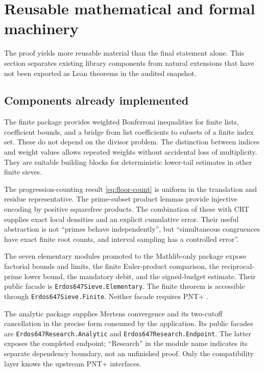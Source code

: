 \documentclass[11pt,a4paper]{article}
\theoremstyle{definition}
\theoremstyle{remark}
\numberwithin{equation}{section}
\newcommand{\smallcode}[1]{{\small\texttt{#1}}}
\begin{document}
\section{Reusable mathematical and formal machinery}\label{sec:reuse}
The proof yields more reusable material than the final statement alone. This
section separates existing library components from natural extensions that
have not been exported as Lean theorems in the audited snapshot.

\subsection{Components already implemented}
The finite package provides weighted Bonferroni inequalities for finite lists,
coefficient bounds, and a bridge from list coefficients to subsets of a finite
index set. These do not depend on the divisor problem. The distinction between
indices and weight values allows repeated weights without accidental loss of
multiplicity. They are suitable building blocks for deterministic lower-tail
estimates in other finite sieves.

The progression-counting result \eqref{eq:floor-count} is uniform in the
translation and residue representative. The prime-subset product lemmas
provide injective encoding by positive squarefree products. The combination
of these with CRT supplies exact local densities and an explicit cumulative
error. Their useful abstraction is not ``primes behave independently'', but
``simultaneous congruences have exact finite root counts, and interval sampling
has a controlled error''.

The seven elementary modules promoted to the Mathlib-only package expose
factorial bounds and limits, the finite Euler-product comparison, the
reciprocal-prime lower bound, the mandatory debit, and the signed-budget
estimate. Their public facade is \smallcode{Erdos647Sieve.Elementary}.
The finite theorem is accessible through \smallcode{Erdos647Sieve.Finite}.
Neither facade requires PNT+ \citep{SieveArtifact}.

The analytic package supplies Mertens convergence and its two-cutoff
cancellation in the precise form consumed by the application. Its public
facades are \smallcode{Erdos647Research.Analytic} and
\smallcode{Erdos647Research.Endpoint}. The latter exposes the completed
endpoint; ``Research'' in the module name indicates its separate dependency
boundary, not an unfinished proof. Only the compatibility layer knows the
upstream PNT+ interfaces.
\end{document}
